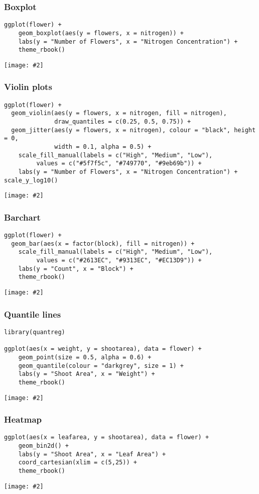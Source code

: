 \documentclass{beamer}
\newcommand{\fig}[2]{\centerline{\texttt{[image: \#2]}}}
\newcommand{\bfr}[1]{\begin{frame}[fragile]\frametitle{{ #1 }}}
\begin{document}
\bfr{Boxplot}\scriptsize
\begin{verbatim}
ggplot(flower) +
    geom_boxplot(aes(y = flowers, x = nitrogen)) +
    labs(y = "Number of Flowers", x = "Nitrogen Concentration") +
    theme_rbook()
\end{verbatim}
\fig{0.7}{boxplot-1.png}
\end{frame}

\bfr{Violin plots}\scriptsize
\vspace{-0.5cm}
\begin{verbatim}
ggplot(flower) +
  geom_violin(aes(y = flowers, x = nitrogen, fill = nitrogen), 
              draw_quantiles = c(0.25, 0.5, 0.75)) +
  geom_jitter(aes(y = flowers, x = nitrogen), colour = "black", height = 0, 
              width = 0.1, alpha = 0.5) +
    scale_fill_manual(labels = c("High", "Medium", "Low"),
         values = c("#5f7f5c", "#749770", "#9eb69b")) +
    labs(y = "Number of Flowers", x = "Nitrogen Concentration") + scale_y_log10()
\end{verbatim}
\fig{0.7}{violin-plot-1.png}
\end{frame}

\bfr{Barchart}\scriptsize
\begin{verbatim}
ggplot(flower) +
  geom_bar(aes(x = factor(block), fill = nitrogen)) +
    scale_fill_manual(labels = c("High", "Medium", "Low"),
         values = c("#2613EC", "#9313EC", "#EC13D9")) +
    labs(y = "Count", x = "Block") +
    theme_rbook()
\end{verbatim}
\fig{0.7}{barchart-1.png}
\end{frame}

\bfr{Quantile lines}\scriptsize
\begin{verbatim}
library(quantreg)

ggplot(aes(x = weight, y = shootarea), data = flower) +
    geom_point(size = 0.5, alpha = 0.6) +
    geom_quantile(colour = "darkgrey", size = 1) +
    labs(y = "Shoot Area", x = "Weight") +
    theme_rbook()
\end{verbatim}
\fig{0.7}{quantile-lines-1.png}
\end{frame}


\bfr{Heatmap}\scriptsize
\begin{verbatim}
ggplot(aes(x = leafarea, y = shootarea), data = flower) +
    geom_bin2d() +
    labs(y = "Shoot Area", x = "Leaf Area") +
    coord_cartesian(xlim = c(5,25)) +
    theme_rbook()
\end{verbatim}
\fig{0.7}{heat-1.png}
\end{frame}
\end{document}

